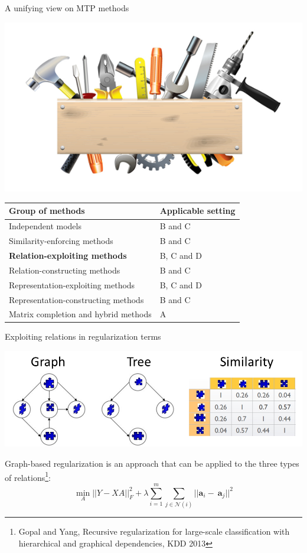 \documentclass[]{beamer}
\renewcommand{\vec}[1]{\boldsymbol{#1}}
\renewcommand{\alert}[1]{\textbf{\color{putblue} #1}}
\begin{document}
\begin{frame}{A unifying view on MTP methods}

\begin{center}
\includegraphics[scale=0.3]{pics/tools}

\begin{tabular}{ll}
\hline
Group of methods & Applicable setting \\
\hline
\hline
Independent models & B and C \\
Similarity-enforcing methods & B and C   \\ 
\alert{Relation-exploiting methods} & B, C and D  \\
Relation-constructing methods & B and C \\
Representation-exploiting methods & B, C and D \\
Representation-constructing methods & B and C \\
Matrix completion and hybrid methods & A \\
\hline  
\end{tabular}
\end{center}
\end{frame}

\begin{frame}{Exploiting relations in regularization terms}

\begin{center}
\includegraphics[width=\textwidth]{pics/targetrelations}
\end{center} \pause 

Graph-based regularization is an approach that can be applied to the three types of relations\footnote{Gopal and Yang, Recursive regularization for large-scale classification with hierarchical
and graphical dependencies, KDD 2013}: 
\begin{equation*}
\min_A ||Y - XA ||^2_F + \lambda \sum_{i=1}^m \sum_{j \in \mathcal{N}(i)} ||\vec{a}_i - \ \vec{a}_j||^2 
\end{equation*}

\end{frame}
\end{document}
